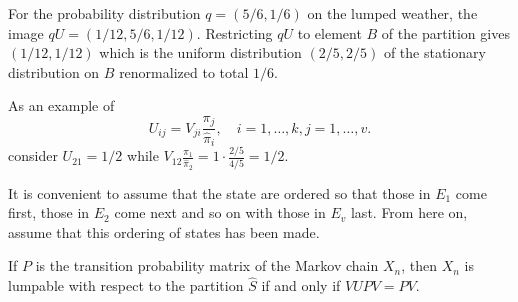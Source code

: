 \documentclass[12pt]{article}
\begin{document}
\begin{example}
      For the probability distribution \( q = (5/6, 1/6) \) on the
      lumped weather, the image \( qU = (1/12, 5/6, 1/12) \).
      Restricting \( qU \)  to element \( B \) of the partition gives \(
      (1/12, 1/12) \) which is the uniform distribution \( (2/5, 2/5) \) of the
      stationary distribution on \( B \) renormalized to total \( 1/6
      \).

      As an example of
      \[
    U_{ij} = V_{ji} \frac{\pi_j}{\hat{\pi}_{i}}, \quad i = 1, \dots, k,
    j = 1, \dots, v.
\] consider \( U_{21} = 1/2 \) while \( V_{12}
\frac{\pi_1}{\hat{\pi}_{2}} = 1 \cdot \frac{2/5}{4/5} = 1/2 \). 
\end{example}

It is convenient to assume that the state are ordered so that those in \(
E_1 \) come first, those in \( E_{2} \) come next and so on with those
in \( E_v \) last.  From here on, assume that this ordering of
states has been made.

\begin{theorem}
    If \( P \) is the transition probability matrix of the Markov chain \(
    X_n \), then \( X_n \) is lumpable with respect to the partition \(
    \hat{S} \) if and only if \( VUPV = PV \).
\end{theorem}
\end{document}
